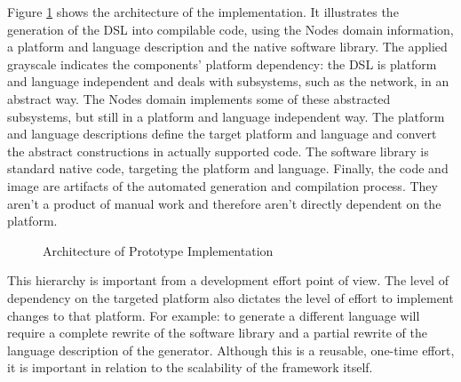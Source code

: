 \documentclass[conference]{IEEEtran}
\begin{document}
Figure \ref{fig:architecture} shows the architecture of the implementation. It
illustrates the generation of the DSL into compilable code, using the Nodes
domain information, a platform and language description and the native software
library. The applied grayscale indicates the components' platform dependency:
the DSL is platform and language independent and deals with subsystems, such as
the network, in an abstract way. The Nodes domain implements some of these
abstracted subsystems, but still in a platform and language independent way.
The platform and language descriptions define the target platform and language
and convert the abstract constructions in actually supported code. The software
library is standard native code, targeting the platform and language. Finally,
the code and image are artifacts of the automated generation and compilation
process. They aren't a product of manual work and therefore aren't directly
dependent on the platform.

\begin{figure}[ht]
  \centering
  \caption{Architecture of Prototype Implementation}
  \label{fig:architecture}
\end{figure}

This hierarchy is important from a development effort point of view. The level
of dependency on the targeted platform also dictates the level of effort to
implement changes to that platform. For example: to generate a different
language will require a complete rewrite of the software library and a partial
rewrite of the language description of the generator. Although this is a
reusable, one-time effort, it is important in relation to the scalability of
the framework itself.
\end{document}
